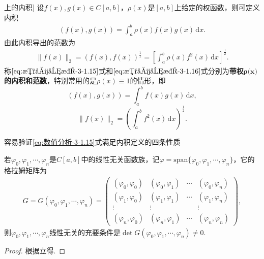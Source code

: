 \documentclass[../../main.tex]{subfiles}
\begin{document}
\begin{definition}[\( C[a,b] \)上的内积]
设\( f(x),g(x) \in C[a,b] \)，\(\rho(x)\)是\([a,b]\)上给定的权函数，则可定义内积
\begin{align}
(f(x),g(x)) = \int_a^b \rho(x) f(x) g(x) \, \mathrm{d}x. \label{eq:数值分析-3-1.15}
\end{align}
由此内积导出的范数为
\begin{align}
\| f(x) \|_2 = (f(x),f(x))^{\frac{1}{2}} = \left[ \int_a^b \rho(x) f^2(x) \, \mathrm{d}x \right]^{\frac{1}{2}}. \label{eq:数值分析-3-1.16}
\end{align}
称\(\eqref{eq:数值分析-3-1.15}\)式和\(\eqref{eq:数值分析-3-1.16}\)式分别为\textbf{带权\(\boldsymbol{\rho }\mathbf{(}\boldsymbol{x}\mathbf{)}\)的内积和范数}，特别常用的是\(\rho(x) \equiv 1\)的情形，即
\[
(f(x),g(x)) = \int_a^b f(x) g(x) \, \mathrm{d}x,
\]
\[
\| f(x) \|_2 = \left( \int_a^b f^2(x) \, \mathrm{d}x \right)^{\frac{1}{2}}.
\]
\end{definition}
\begin{remark}
容易验证\eqref{eq:数值分析-3-1.15}式满足内积定义的四条性质
\end{remark}

\begin{example}

若\(\varphi_0, \varphi_1, \cdots, \varphi_n\)是\(C[a,b]\)中的线性无关函数族，记\(\varphi = \text{span}\{\varphi_0, \varphi_1, \cdots, \varphi_n\}\)，它的格拉姆矩阵为
\begin{align}
G = G(\varphi_0, \varphi_1, \cdots, \varphi_n) = \begin{pmatrix}
(\varphi_0, \varphi_0) & (\varphi_0, \varphi_1) & \cdots & (\varphi_0, \varphi_n) \\
(\varphi_1, \varphi_0) & (\varphi_1, \varphi_1) & \cdots & (\varphi_1, \varphi_n) \\
\vdots & \vdots & & \vdots \\
(\varphi_n, \varphi_0) & (\varphi_n, \varphi_1) & \cdots & (\varphi_n, \varphi_n)
\end{pmatrix}, \label{eq:数值分析-3-1.17}
\end{align}
则\(\varphi_0, \varphi_1, \cdots, \varphi_n\)线性无关的充要条件是\(\det G(\varphi_0, \varphi_1, \cdots, \varphi_n) \neq 0\).
\end{example}
\begin{proof}
根据立得.
\end{proof}
\end{document}
